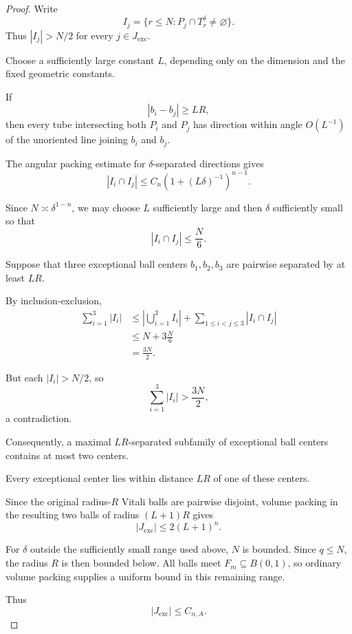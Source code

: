 \documentclass[11pt, letterpaper]{nyjm}
\begin{document}
	\begin{proof}
		Write
		\[
		I_j=\{r\le N:P_j\cap T_r^\delta
		\ne\varnothing\}.
		\]
		Thus $|I_j|>N/2$ for every
		$j\in J_{\mathrm{exc}}$.
		
		Choose a sufficiently large constant
		$L$, depending only on the dimension
		and the fixed geometric constants.
		
		If
		\[
		|b_i-b_j|\ge LR,
		\]
		then every tube intersecting both
		$P_i$ and $P_j$ has direction within
		angle $O(L^{-1})$ of the unoriented
		line joining $b_i$ and $b_j$.
		
		The angular packing estimate for
		$\delta$-separated directions gives
		\[
		|I_i\cap I_j|
		\le C_n(1+(L\delta)^{-1})^{n-1}.
		\]
		
		Since $N\asymp\delta^{1-n}$,
		we may choose $L$ sufficiently large
		and then $\delta$ sufficiently small
		so that
		\[
		|I_i\cap I_j|\le \frac N6.
		\]
		
		Suppose that three exceptional
		ball centers $b_1,b_2,b_3$
		are pairwise separated by at least $LR$.
		
		By inclusion-exclusion,
		\[
		\begin{aligned}
			\sum_{i=1}^3|I_i|
			&\le
			\left|\bigcup_{i=1}^3 I_i\right|
			+\sum_{1\le i<j\le3}|I_i\cap I_j|\\
			&\le N+3\frac N6\\
			&=\frac{3N}{2}.
		\end{aligned}
		\]
		
		But each $|I_i|>N/2$, so
		\[
		\sum_{i=1}^3|I_i|>\frac{3N}{2},
		\]
		a contradiction.
		
		Consequently, a maximal
		$LR$-separated subfamily of
		exceptional ball centers contains
		at most two centers.
		
		Every exceptional center lies within
		distance $LR$ of one of these centers.
		
		Since the original radius-$R$
		Vitali balls are pairwise disjoint,
		volume packing in the resulting
		two balls of radius $(L+1)R$ gives
		\[
		|J_{\mathrm{exc}}|
		\le 2(L+1)^n.
		\]
		
		For $\delta$ outside the sufficiently
		small range used above, $N$ is bounded.
		Since $q\le N$, the radius $R$ is then
		bounded below. All balls meet
		$F_m\subseteq B(0,1)$, so ordinary
		volume packing supplies a uniform
		bound in this remaining range.
		
		Thus
		\[
		|J_{\mathrm{exc}}|\le C_{n,A}.
		\]
	\end{proof}
	
\end{document}
